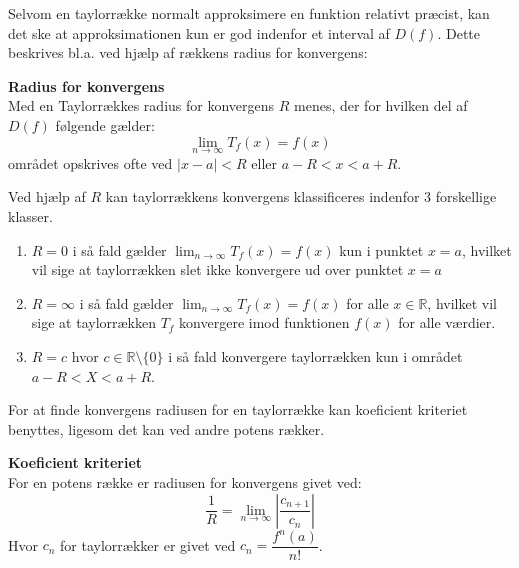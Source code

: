 Selvom en taylorrække normalt approksimere en funktion relativt præcist, kan det ske at
approksimationen kun er god indenfor et interval af $D(f)$. Dette beskrives bl.a. ved hjælp af rækkens
radius for konvergens:
\begin{defn} %
    \textbf{Radius for konvergens}\\
    Med en Taylorrækkes radius for konvergens $R$ menes, der for hvilken del af $D(f)$ følgende gælder:
    \[
        \lim_{n \rightarrow \infty} T_f(x) = f(x)
    \]
    området opskrives ofte ved $|x-a| < R$ eller $a - R < x < a + R$.
\end{defn}
\label{def:radiusForKonvergens}
Ved hjælp af $R$ kan taylorrækkens konvergens klassificeres indenfor 3 forskellige klasser.
\begin{enumerate} %
    \item $R = 0$ i så fald gælder $\lim_{n \rightarrow \infty} T_f(x) = f(x)$ kun i punktet $x = a$,
    hvilket vil sige at taylorrækken slet ikke konvergere ud over punktet $x = a$
    \item $R = \infty$ i så fald gælder $\lim_{n \rightarrow \infty} T_f(x) = f(x)$ for alle $x \in \mathbb{R}$,
    hvilket vil sige at taylorrækken $T_f$ konvergere imod funktionen $f(x)$ for alle værdier.
    \item $R = c$ hvor $c \in \mathbb{R}\setminus\{0\}$ i så fald konvergere taylorrækken kun i området $a - R < X < a + R$.
\end{enumerate}
For at finde konvergens radiusen for en taylorrække kan koeficient kriteriet benyttes, ligesom det kan ved andre potens rækker.
\begin{defn} %
    \textbf{Koeficient kriteriet}\\For en potens række er radiusen for konvergens givet ved:
    \[
        \frac{1}{R} = \lim_{n \rightarrow \infty} \left\lvert \frac{c_{n + 1}}{c_n} \right\lvert
    \]
    Hvor $c_n$ for taylorrækker er givet ved $c_n = \dfrac{f^n(a)}{n!}$.
\end{defn} %
\label{def:koeficientKriteriet}

